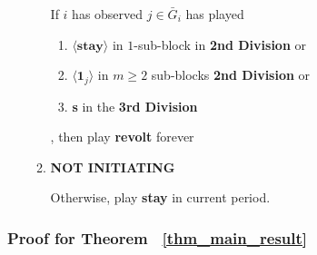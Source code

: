 \documentclass[12pt,letter]{article}
\theoremstyle{definition}
\theoremstyle{remark}
\theoremstyle{claim}
\begin{document}
\begin{itemize}
\begin{enumerate}
If $i$ has observed $j\in \bar{G}_i$ has played
\begin{enumerate}
\item $\langle \textbf{stay} \rangle$ in $1$-sub-block in \textbf{2nd Division}  or
\item $\langle \mathbf{1}_j \rangle$ in $m\geq 2$ sub-blocks \textbf{2nd Division}  or
\item \textbf{s} in the \textbf{3rd Division} 
\end{enumerate}
, then play \textbf{revolt} forever

\item \textbf{NOT INITIATING} 

Otherwise, play 
\textbf{stay} 
in current period.
\end{enumerate}
\end{itemize}





\subsubsection{Proof for Theorem ~\ref{thm_main_result}}
\end{document}
